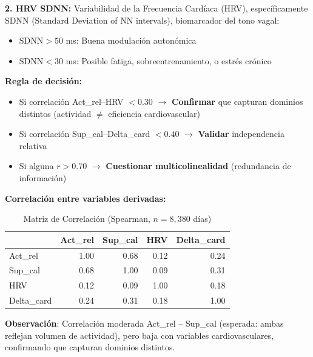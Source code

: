 \documentclass[12pt,letterpaper,twoside]{report}
\begin{document}
\begin{calculobox}
\begin{estadisticobox}
\textbf{2. HRV SDNN:} Variabilidad de la Frecuencia Cardíaca (HRV), específicamente SDNN (Standard Deviation of NN intervals), biomarcador del tono vagal:
\begin{itemize}[noitemsep]
    \item $\text{SDNN} > 50$ ms: Buena modulación autonómica
    \item $\text{SDNN} < 30$ ms: Posible fatiga, sobreentrenamiento, o estrés crónico
\end{itemize}
\end{estadisticobox}

\begin{reglabox}
\textbf{Regla de decisión:}

\begin{itemize}[noitemsep]
    \item Si correlación Act\_rel--HRV $< 0.30$ $\to$ \textbf{Confirmar} que capturan dominios distintos (actividad $\neq$ eficiencia cardiovascular)
    \item Si correlación Sup\_cal--Delta\_card $< 0.40$ $\to$ \textbf{Validar} independencia relativa
    \item Si alguna $r > 0.70$ $\to$ \textbf{Cuestionar multicolinealidad} (redundancia de información)
\end{itemize}
\end{reglabox}

\begin{calculobox}
\textbf{Correlación entre variables derivadas:}

\begin{table}[H]
\centering
\begin{tabular}{@{}lrrrr@{}}
\toprule
 & \textbf{Act\_rel} & \textbf{Sup\_cal} & \textbf{HRV} & \textbf{Delta\_card} \\
\midrule
Act\_rel     & 1.00 & 0.68 & 0.12 & 0.24 \\
Sup\_cal     & 0.68 & 1.00 & 0.09 & 0.31 \\
HRV          & 0.12 & 0.09 & 1.00 & 0.18 \\
Delta\_card  & 0.24 & 0.31 & 0.18 & 1.00 \\
\bottomrule
\end{tabular}
\caption{Matriz de Correlación (Spearman, $n=8,380$ días)}
\label{tab:derived_corr}
\end{table}

\textbf{Observación}: Correlación moderada Act\_rel -- Sup\_cal (esperada: ambas reflejan volumen de actividad), pero baja con variables cardiovasculares, confirmando que capturan dominios distintos.
\end{calculobox}


\end{calculobox}
\end{document}
